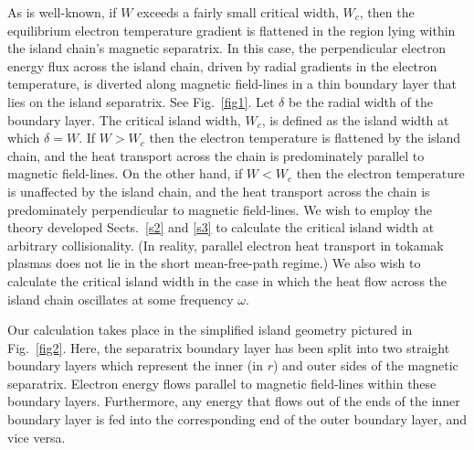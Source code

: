\documentclass[12pt,prb,aps]{revtex4-1}
\begin{document}
As is well-known, if $W$ exceeds a fairly small critical width, $W_c$, then the equilibrium electron temperature
gradient is flattened in the region lying within the island chain's magnetic separatrix. In this case, the perpendicular electron energy flux across the island chain, driven by radial gradients in the electron temperature, is diverted   along magnetic field-lines
in a thin boundary layer that lies on the island separatrix. See Fig.~\ref{fig1}. Let $\delta$ be the radial width of the boundary layer. The critical island width, $W_c$, is defined as the island width at which $\delta = W$. If
$W>W_c$ then the electron temperature is flattened by the island chain, and the heat transport across the chain is predominately parallel to magnetic field-lines. On the other hand,  if $W<W_c$ then the electron temperature is unaffected by the island chain, and the heat transport across the chain is predominately perpendicular to magnetic field-lines. We wish to employ the theory developed Sects.~\ref{s2} and \ref{s3} to calculate the critical
island width at arbitrary collisionality. (In reality, parallel electron heat transport in tokamak plasmas does not lie in the short mean-free-path regime.) We also wish to calculate the critical island width in the case
in which the heat flow across the island chain oscillates at some frequency $\omega$. 

Our calculation takes place in the simplified island geometry pictured in Fig.~\ref{fig2}. Here, the separatrix boundary layer has been split into two straight boundary layers which represent the inner
(in $r$) and outer sides of the magnetic separatrix.  Electron energy flows parallel to magnetic field-lines within these boundary layers. Furthermore, any energy that flows out of the ends of the inner boundary layer is
fed into the corresponding end of the outer boundary layer, and vice versa. 
\end{document}
